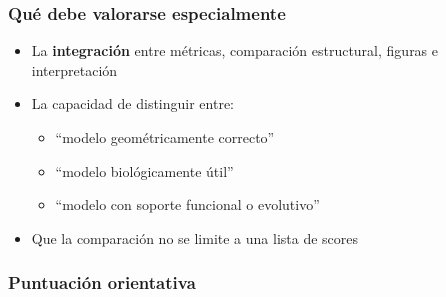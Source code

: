 \documentclass[
  11pt,
  a4paper,
  twoside]{scrreprt}
\providecommand{\tightlist}{%
  \setlength{\itemsep}{0pt}\setlength{\parskip}{0pt}}
\begin{document}
\subsubsection{Qué debe valorarse
especialmente}\label{quuxe9-debe-valorarse-especialmente-1}

\begin{itemize}
\item
  La \textbf{integración} entre métricas, comparación estructural,
  figuras e interpretación
\item
  La capacidad de distinguir entre:

  \begin{itemize}
  \tightlist
  \item
    ``modelo geométricamente correcto''
  \item
    ``modelo biológicamente útil''
  \item
    ``modelo con soporte funcional o evolutivo''
  \end{itemize}
\item
  Que la comparación no se limite a una lista de scores
\end{itemize}

\subsubsection{Puntuación
orientativa}\label{puntuaciuxf3n-orientativa-1}
\end{document}
